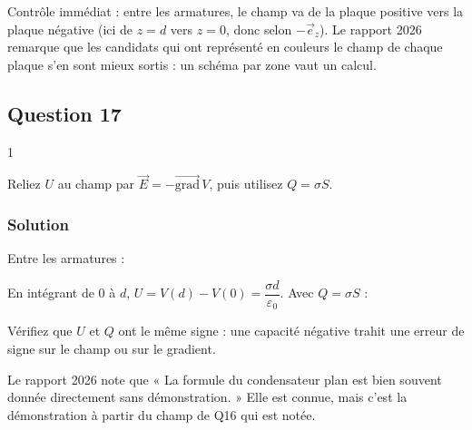 \documentclass[11pt,a4paper]{article}
\newcommand{\equationajustee}[1]{%
  \sbox{\boiteequation}{$\displaystyle #1$}%
  \ifdim\wd\boiteequation>\linewidth
    \[\resizebox{\linewidth}{!}{\usebox{\boiteequation}}\]%
  \else
    \[#1\]%
  \fi}
\begin{document}
\begin{methode}

Contrôle immédiat : entre les armatures, le champ va de la plaque positive vers la plaque négative (ici de \(z=d\) vers \(z=0\), donc selon \(-\vec e_z\)). Le rapport 2026 remarque que les candidats qui ont représenté en couleurs le champ de chaque plaque s'en sont mieux sortis : un schéma par zone vaut un calcul.

\end{methode}

\hypertarget{question-17}{%
\subsection{Question 17}\label{question-17}}

\begin{indication}{1}

Reliez \(U\) au champ par \(\vec E=-\overrightarrow{\mathrm{grad}}\,V\), puis utilisez \(Q=\sigma S\).

\end{indication}

\hypertarget{solution-16}{%
\subsubsection{Solution}\label{solution-16}}

Entre les armatures :

\equationajustee{-\frac{\mathrm{d}V}{\mathrm{d}z}=-\frac{\sigma}{\varepsilon_0}.}

En intégrant de \(0\) à \(d\), \(U=V(d)-V(0)=\dfrac{\sigma d}{\varepsilon_0}\). Avec \(Q=\sigma S\) :

\equationajustee{\boxed{C=\frac{\varepsilon_0S}{d}}}

\begin{piege}

Vérifiez que \(U\) et \(Q\) ont le même signe : une capacité négative trahit une erreur de signe sur le champ ou sur le gradient.

\end{piege}

\begin{jury}

Le rapport 2026 note que « La formule du condensateur plan est bien souvent donnée directement sans démonstration. » Elle est connue, mais c'est la démonstration à partir du champ de Q16 qui est notée.

\end{jury}
\end{document}

